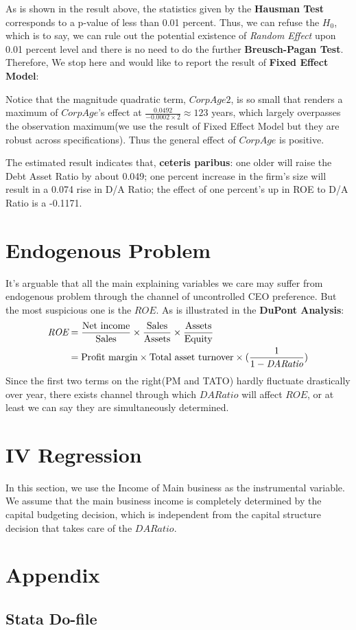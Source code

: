 \documentclass{article}
\begin{document}
	\begin{stlog}
	\nullskip
	\end{stlog}

As is shown in the result above, the statistics given by the {\bf Hausman Test} corresponds to a p-value of less than 0.01 percent. Thus, we can refuse the $H_0$, which is to say, we can rule out the potential existence of {\it Random Effect} upon 0.01 percent level and there is no need to do the further {\bf Breusch-Pagan Test}. 
Therefore, We stop here and would like to report the result of {\bf Fixed Effect Model}:

Notice that the magnitude quadratic term, $CorpAge2$, is so small that renders a maximum of $CorpAge$'s effect at $\frac{0.0492}{-0.0002\times2}\approx 123$ years, which largely overpasses the observation maximum(we use the result of Fixed Effect Model but they are robust across specifications). Thus the general effect of $CorpAge$ is positive.

The estimated result indicates that, {\bf ceteris paribus}: one older will raise the Debt Asset Ratio by about 0.049; one percent increase in the firm's size will result in a 0.074 rise in D/A Ratio; the effect of one percent's up in ROE to D/A Ratio is a -0.1171.

\newpage
\section{Endogenous Problem}\label{sec:endogenous}
It's arguable that all the main explaining variables we care may suffer from endogenous problem through the channel of uncontrolled CEO preference. But the most suspicious one is the $ROE$. As is illustrated in the {\bf DuPont Analysis}:
\begin{align}
	\notag
	\textit{ROE} &= \frac{\text{Net income}}{\text{Sales}}\times\frac{\text{Sales}}{\text{Assets}}\times\frac{\text{Assets}}{\text{Equity}}\\
	&= \text{Profit margin}\times\text{Total asset turnover}\times(\frac{1}{1-\textit{DARatio}})
\end{align}
Since the first two terms on the right(PM and TATO) hardly fluctuate drastically over year, there exists channel through which $DARatio$ will affect $ROE$, or at least we can say they are simultaneously determined.

\section{IV Regression}\label{sec:IV}
In this section, we use the Income of Main business as the instrumental variable. We assume that the main business income is completely determined by the capital budgeting decision, which is independent from the capital structure decision that takes care of the $DARatio$. 


\newpage
\begin{appendix}\label{sec:appendix}
\section{Appendix}
\subsection{Stata Do-file}

\nocite{*}


\end{appendix}
\end{document}
